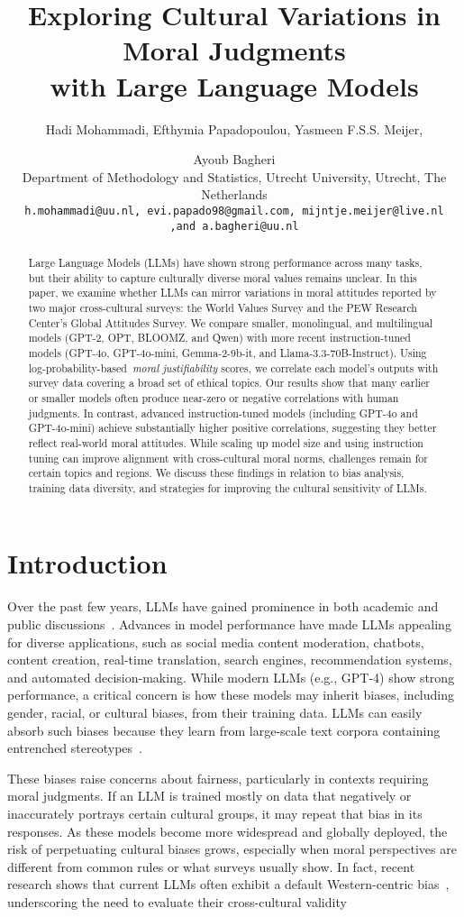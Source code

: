 \documentclass[11pt]{article}
\title{Exploring Cultural Variations in Moral Judgments \\with Large Language Models
}
\author{Hadi Mohammadi, Efthymia Papadopoulou, Yasmeen F.S.S. Meijer,\and Ayoub Bagheri \\
Department of Methodology and Statistics, Utrecht University, Utrecht, The Netherlands \\
\texttt{h.mohammadi@uu.nl, evi.papado98@gmail.com, mijntje.meijer@live.nl} \\
\texttt{,and a.bagheri@uu.nl}}
\begin{document}
\maketitle
\begin{abstract}
Large Language Models (LLMs) have shown strong performance across many tasks, but their ability to capture culturally diverse moral values remains unclear. In this paper, we examine whether LLMs can mirror variations in moral attitudes reported by two major cross-cultural surveys: the World Values Survey and the PEW Research Center’s Global Attitudes Survey. We compare smaller, monolingual, and multilingual models (GPT-2, OPT, BLOOMZ, and Qwen) with more recent instruction-tuned models (GPT-4o, GPT-4o-mini, Gemma-2-9b-it, and Llama-3.3-70B-Instruct). Using log-probability-based~\emph{moral justifiability} scores, we correlate each model’s outputs with survey data covering a broad set of ethical topics. Our results show that many earlier or smaller models often produce near-zero or negative correlations with human judgments. In contrast, advanced instruction-tuned models (including GPT-4o and GPT-4o-mini) achieve substantially higher positive correlations, suggesting they better reflect real-world moral attitudes. While scaling up model size and using instruction tuning can improve alignment with cross-cultural moral norms, challenges remain for certain topics and regions. We discuss these findings in relation to bias analysis, training data diversity, and strategies for improving the cultural sensitivity of LLMs.
\end{abstract}


\section{Introduction}
Over the past few years, LLMs have gained prominence in both academic and public discussions~\citep{Bender2021}. Advances in model performance have made LLMs appealing for diverse applications, such as social media content moderation, chatbots, content creation, real-time translation, search engines, recommendation systems, and automated decision-making. While modern LLMs (e.g., GPT-4) show strong performance, a critical concern is how these models may inherit biases, including gender, racial, or cultural biases, from their training data. LLMs can easily absorb such biases because they learn from large-scale text corpora containing entrenched stereotypes~\citep{Staczak2021, karpouzis2024}.

These biases raise concerns about fairness, particularly in contexts requiring moral judgments. If an LLM is trained mostly on data that negatively or inaccurately portrays certain cultural groups, it may repeat that bias in its responses. As these models become more widespread and globally deployed, the risk of perpetuating cultural biases grows, especially when moral perspectives are different from common rules or what surveys usually show. In fact, recent research shows that current LLMs often exhibit a default Western-centric bias~\citep{adilazuarda2024towards}, underscoring the need to evaluate their cross-cultural validity
\end{document}
